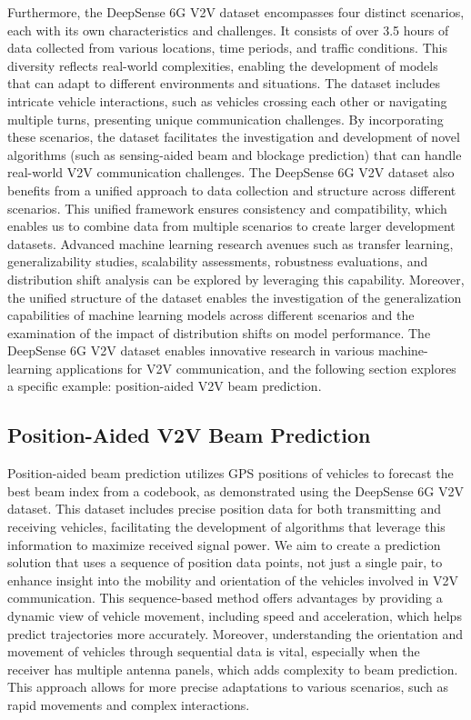 \documentclass[10pt,comsoc]{IEEEtran}
\begin{document}
Furthermore, the DeepSense 6G V2V dataset encompasses four distinct scenarios, each with its own characteristics and challenges. It consists of over 3.5 hours of data collected from various locations, time periods, and traffic conditions. This diversity reflects real-world complexities, enabling the development of models that can adapt to different environments and situations. The dataset includes intricate vehicle interactions, such as vehicles crossing each other or navigating multiple turns, presenting unique communication challenges. By incorporating these scenarios, the dataset facilitates the investigation and development of novel algorithms (such as sensing-aided beam and blockage prediction) that can handle real-world V2V communication challenges. The DeepSense 6G V2V dataset also benefits from a unified approach to data collection and structure across different scenarios. This unified framework ensures consistency and compatibility, which enables us to combine data from multiple scenarios to create larger development datasets. Advanced machine learning research avenues such as transfer learning, generalizability studies, scalability assessments, robustness evaluations, and distribution shift analysis can be explored by leveraging this capability. Moreover, the unified structure of the dataset enables the investigation of the generalization capabilities of machine learning models across different scenarios and the examination of the impact of distribution shifts on model performance. The DeepSense 6G V2V dataset enables innovative research in various machine-learning applications for V2V communication, and the following section explores a specific example: position-aided V2V beam prediction. 


\subsection{Position-Aided V2V Beam Prediction} \label{subsec:position-beam}
Position-aided beam prediction utilizes GPS positions of vehicles to forecast the best beam index from a codebook, as demonstrated using the DeepSense 6G V2V dataset. This dataset includes precise position data for both transmitting and receiving vehicles, facilitating the development of algorithms that leverage this information to maximize received signal power. We aim to create a prediction solution that uses a sequence of position data points, not just a single pair, to enhance insight into the mobility and orientation of the vehicles involved in V2V communication. This sequence-based method offers advantages by providing a dynamic view of vehicle movement, including speed and acceleration, which helps predict trajectories more accurately. Moreover, understanding the orientation and movement of vehicles through sequential data is vital, especially when the receiver has multiple antenna panels, which adds complexity to beam prediction. This approach allows for more precise adaptations to various scenarios, such as rapid movements and complex interactions.
\end{document}
